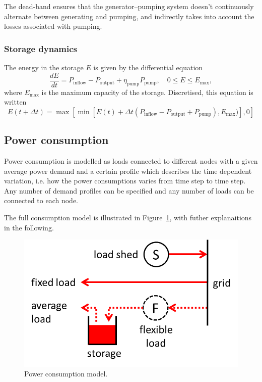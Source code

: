 \documentclass{article}
\begin{document}
The dead-band ensures that the generator--pumping system doesn't continuously alternate between generating and pumping, and indirectly takes into account the losses associated with pumping.


\subsubsection{Storage dynamics}

The energy in the storage $E$ is given by the differential equation
\begin{equation}
	\frac{dE}{dt} = P_\text{inflow} - P_\text{output} + \eta_\text{pump}P_\text{pump}, 
	\quad 0 \le E \le E_\text{max},
\end{equation}
where $E_\text{max}$ is the maximum capacity of the storage. Discretised, this equation is written
\begin{equation}
	E(t+\Delta t) = \max[\min[E(t) 
	+ \Delta t (P_\text{inflow} - P_\text{output} + P_\text{pump}), 
	E_\text{max})],0]
\end{equation}




\subsection{Power consumption}

Power consumption is modelled as loads connected to different nodes with a given average power demand and a certain profile which describes the time dependent variation, i.e. how the power consumptions varies from time step to time step. Any number of demand profiles can be specified and any number of loads can be connected to each node.

The full consumption model is illustrated in Figure~\ref{fig:load_model}, with futher explanaitions in the following.


\begin{figure}
\centering
\includegraphics[scale=0.6]{load_model.png}
\caption{Power consumption model.}
\label{fig:load_model}
\end{figure}
\end{document}
